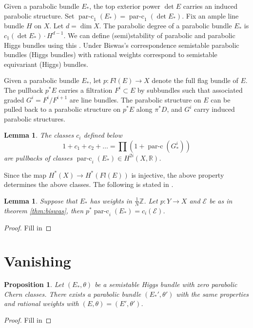 \documentclass{amsart}
\newtheorem{prop}[thm]{Proposition}
\newtheorem{lemma}[thm]{Lemma}
\DeclareMathOperator*{\parc}{par-c}
\newcommand {\R} {{\mathbb R}}
\newcommand {\Z} {{\mathbb Z}}
\newcommand {\E} {{\mathcal E}}
\begin{document}
 Given a parabolic bundle $E_*$, the top exterior power $\det E$ carries an induced parabolic structure.
 Set $\parc_1(E_*)= \parc_1(\det E_*)$.
Fix an ample line bundle $H$ on $X$.  Let $d=\dim X$.
The parabolic degree of a parabolic bundle $E_*$ is $c_1(\det E_*)\cdot H^{d-1}$.
We can define (semi)stability of parabolic and parabolic Higgs bundles using this \cite{my, yokogawa}.
Under Biswas's correspondence semistable parabolic bundles (Higgs bundles) with rational weights correspond
to semistable equivariant (Higgs) bundles.
 
 
Given a parabolic bundle $E_*$, let $p:Fl(E)\to X$ denote the full flag bundle of $E$. The pullback $p^*E$ 
carries a filtration $F^i\subset E$ by subbundles such that  associated graded $G^i = F^i/F^{i+1}$ are line bundles.
The parabolic structure on $E$ can be pulled back to  a parabolic structure on  $p^*E$ along $\pi^*D$, 
and $G^i$ carry induced parabolic structures.

\begin{lemma}
The classes $c_i$ defined below
$$1+c_1+ c_2+\ldots = \prod (1+\parc(G^i_*))$$
are pullbacks of classes  $\parc_i(E_*)\in H^{2i}(X,\R)$.
\end{lemma}

Since the map $H^*(X)\to H^*(Fl(E))$ is injective, the above property determines the above classes.
The following is stated in \cite[4.6]{biswas2}.

\begin{lemma}
 Suppose that $E_*$ has weights in $\frac{1}{N}\Z$. Let $p:Y\to X$ and $\mathcal{E}$ be as in theorem \ref{thm:biswas},
 then $p^*\parc_i(E_*)= c_i(\E)$.
\end{lemma}

\begin{proof}
 {\color{red} Fill in}
\end{proof}


\section{Vanishing}

\begin{prop}
 Let $(E_*,\theta)$ be a semistable Higgs bundle with zero parabolic Chern classes. There exists
 a parabolic bundle $(E_*',\theta')$ with  the same properties and rational weights with  $(E,\theta)=(E', \theta')$.
\end{prop}

\begin{proof}
{\color{red} Fill in} 
\end{proof}
\end{document}
